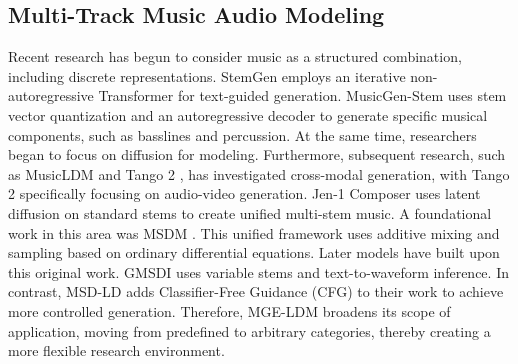 \documentclass[lettersize,journal]{IEEEtran}
\begin{document}
\subsection{Multi-Track Music Audio Modeling }
Recent research has begun to consider music as a structured combination, including discrete representations. StemGen \cite{parker2024stemgen} employs an iterative non-autoregressive Transformer for text-guided generation. MusicGen-Stem \cite{rouard2025musicgen} uses stem vector quantization and an autoregressive decoder to generate specific musical components, such as basslines and percussion. 
At the same time, researchers began to focus on diffusion for modeling. Furthermore, subsequent research, such as MusicLDM \cite{chen2024musicldm} and Tango 2 \cite{majumder2024tango}, has investigated cross-modal generation, with Tango 2 specifically focusing on audio-video generation. Jen-1 Composer \cite{yao2025jen} uses latent diffusion on standard stems to create unified multi-stem music. A foundational work in this area was MSDM \cite{mariani2023multi}. This unified framework uses additive mixing and sampling based on ordinary differential equations. Later models have built upon this original work. GMSDI \cite{postolache2024generalized} uses variable stems and text-to-waveform inference. In contrast, MSD-LD \cite{karchkhadze2025simultaneous} adds Classifier-Free Guidance (CFG) \cite{ho2022classifier} to their work to achieve more controlled generation. Therefore, MGE-LDM \cite{chae2025mge} broadens its scope of application, moving from predefined to arbitrary categories, thereby creating a more flexible research environment.
\end{document}
